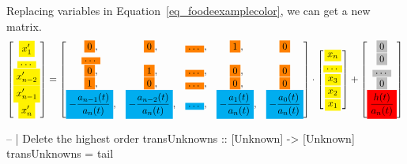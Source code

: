 Replacing variables in Equation~\ref{eq_foodeexamplecolor}, we can get a new matrix.
\begin{equation}
	\begin{bmatrix}
		\highlight{yellow}{x_{1}'} \\
    \highlight{yellow}{\dots} \\
    \highlight{yellow}{x_{n-2}'} \\
    \highlight{yellow}{x_{n-1}'} \\
    \highlight{yellow}{x_{n}'}
	\end{bmatrix}
    = 
  \begin{bmatrix}
		\highlight{orange}{0}, & \highlight{orange}{0}, & \highlight{orange}{\dots}, & \highlight{orange}{1}, & \highlight{orange}{0} \\
    \highlight{orange}{\dots} \\
    \highlight{orange}{0}, & \highlight{orange}{1}, & \highlight{orange}{\dots}, & \highlight{orange}{0}, & \highlight{orange}{0} \\
    \highlight{orange}{1}, & \highlight{orange}{0}, & \highlight{orange}{\dots}, & \highlight{orange}{0}, & \highlight{orange}{0} \\
    \highlight{cyan}{-\frac{a_{n-1}(t)}{a_n(t)}}, & \highlight{cyan}{-\frac{a_{n-2}(t)}{a_n(t)}}, & \highlight{cyan}{\dots}, & \highlight{cyan}{-\frac{a_{1}(t)}{a_n(t)}}, & \highlight{cyan}{-\frac{a_{0}(t)}{a_n(t)}}
	\end{bmatrix}
    \cdot
  \begin{bmatrix}
    \highlight{yellow}{x_{n}} \\
    \highlight{yellow}{\dots} \\
    \highlight{yellow}{x_{3}} \\
		\highlight{yellow}{x_{2}} \\
    \highlight{yellow}{x_{1}}
	\end{bmatrix}
    + 
  \begin{bmatrix}
    \highlight{lightgray}{0} \\
    \highlight{lightgray}{0} \\
    \highlight{lightgray}{\dots} \\
    \highlight{lightgray}{0} \\
    \highlight{red}{\frac{h(t)}{a_n(t)}}
	\end{bmatrix}
\end{equation}

\begin{listing}[ht]
\begin{haskell1}
-- | Delete the highest order
transUnknowns :: [Unknown] -> [Unknown]
transUnknowns = tail
\end{haskell1}
\label{code_isohighode}
\end{listing}

